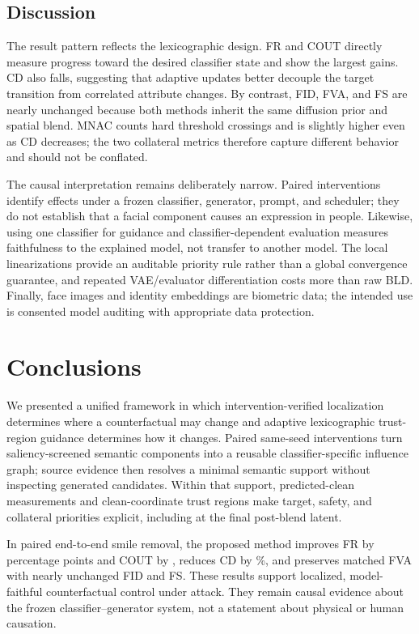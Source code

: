 \documentclass[10pt,twocolumn]{article}
\newcommand{\bld}{\textsc{BLD}}
\begin{document}
\subsection{Discussion}

The result pattern reflects the lexicographic design. FR and COUT directly
measure progress toward the desired classifier state and show the largest
gains. CD also falls, suggesting that adaptive updates better decouple the
target transition from correlated attribute changes. By contrast, FID, FVA,
and FS are nearly unchanged because both methods inherit the same diffusion
prior and spatial blend. MNAC counts hard threshold crossings and is slightly
higher even as CD decreases; the two collateral metrics therefore capture
different behavior and should not be conflated.

The causal interpretation remains deliberately narrow. Paired interventions
identify effects under a frozen classifier, generator, prompt, and scheduler;
they do not establish that a facial component causes an expression in people.
Likewise, using one classifier for guidance and classifier-dependent evaluation
measures faithfulness to the explained model, not transfer to another model.
The local linearizations provide an auditable priority rule rather than a
global convergence guarantee, and repeated VAE/evaluator differentiation costs
more than raw \bld{}. Finally, face images and identity embeddings are biometric
data; the intended use is consented model auditing with appropriate data
protection.

\FloatBarrier
\section{Conclusions}

We presented a unified framework in which intervention-verified localization
determines where a counterfactual may change and adaptive lexicographic
trust-region guidance determines how it changes. Paired same-seed
interventions turn saliency-screened semantic components into a reusable
classifier-specific influence graph; source evidence then resolves a minimal
semantic support without inspecting generated candidates. Within that support,
predicted-clean measurements and clean-coordinate trust regions make target,
safety, and collateral priorities explicit, including at the final post-blend
latent.

In paired end-to-end smile removal, the proposed method improves FR by
\EndToEndFRGainPctPoints{} percentage points and COUT by
\EndToEndCOUTGain{}, reduces CD by \EndToEndCDReductionPct\%, and preserves
matched FVA with nearly unchanged FID and FS. These results support localized,
model-faithful counterfactual control under attack. They remain causal evidence
about the frozen classifier--generator system, not a statement about physical
or human causation.

\small


\end{document}
